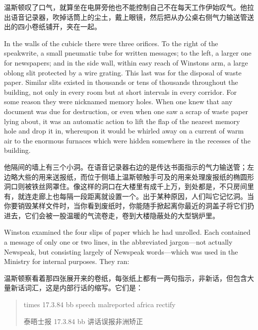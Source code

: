 \begin{paracol}{2}
温斯顿叹了口气，就算坐在电屏旁他也不能控制自己不在每天工作伊始叹气。他拉出语音记录器，吹掉话筒上的尘土，戴上眼镜，然后把从办公桌右侧气力输送管送出的四小卷纸铺开，夹在一起。

\switchcolumn*

In the walls of the cubicle there were three orifices. To the right of
the speakwrite, a small pneumatic tube for written messages; to the
left, a larger one for newspapers; and in the side wall, within easy
reach of Winston\textquotesingle s arm, a large oblong slit protected by
a wire grating. This last was for the disposal of waste paper. Similar
slits existed in thousands or tens of thousands throughout the building,
not only in every room but at short intervals in every corridor. For
some reason they were nicknamed memory holes. When one knew that any
document was due for destruction, or even when one saw a scrap of waste
paper lying about, it was an automatic action to lift the flap of the
nearest memory hole and drop it in, whereupon it would be whirled away
on a current of warm air to the enormous furnaces which were hidden
somewhere in the recesses of the building.

\switchcolumn

他隔间的墙上有三个小洞。在语音记录器右边的是传达书面指示的气力输送管；左边略大些的用来送报纸，而位于侧墙上温斯顿触手可及的用来处理废报纸的椭圆形洞口则被铁丝网罩住。像这样的洞口在大楼里有成千上万，到处都是，不只房间里有，就连走廊上也每隔一段距离就设置一个。出于某种原因，人们叫它记忆洞。当你要销毁某样文件时，当你看到废纸时，你能随手掀起离你最近的洞盖子将它们扔进去，它们会被一股温暖的气流卷走，卷到大楼隐蔽处的大型锅炉里。

\switchcolumn*

Winston examined the four slips of paper which he had unrolled. Each
contained a message of only one or two lines, in the abbreviated
jargon---not actually Newspeak, but consisting largely of Newspeak
words---which was used in the Ministry for internal purposes. They ran:

\switchcolumn

温斯顿察看着那四张展开来的卷纸，每张纸上都有一两句指示，非新话，但包含大量新话词汇，这是内部行话的缩写。它们是：

\switchcolumn*

\begin{quotation}
times 17.3.84 bb speech malreported africa rectify

\switchcolumn

泰晤士报 17.3.84 bb 讲话误报非洲矫正


\end{quotation}
\end{paracol}
